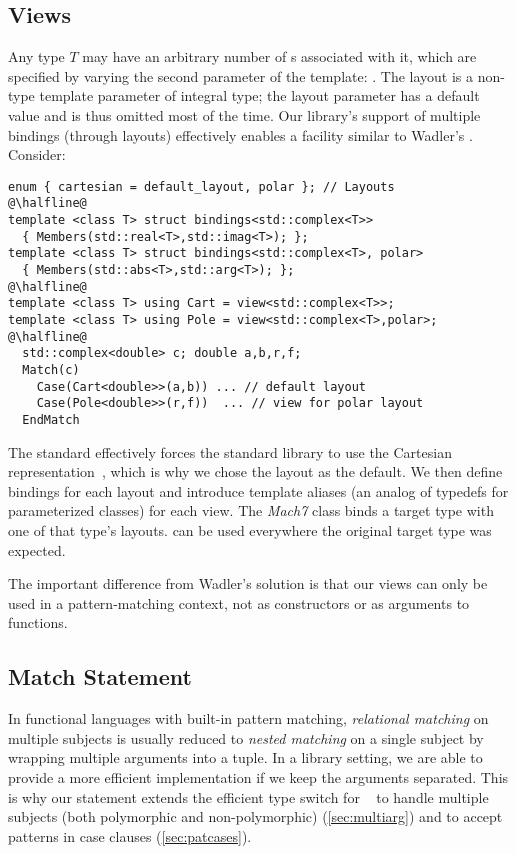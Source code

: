 \subsection{Views}
\label{sec:view}

Any type $T$ may have an arbitrary number of s associated with it, 
which are specified by varying the second parameter of the  
template: . The layout is a non-type template parameter of 
integral type; the layout parameter has a default value and is thus omitted most of the time.
Our library's support of multiple bindings (through layouts) effectively enables 
a facility similar to Wadler's \cite{Wadler87}. Consider:

\begin{lstlisting}[keepspaces]
enum { cartesian = default_layout, polar }; // Layouts
@\halfline@
template <class T> struct bindings<std::complex<T>>
  { Members(std::real<T>,std::imag<T>); };
template <class T> struct bindings<std::complex<T>, polar>
  { Members(std::abs<T>,std::arg<T>); };
@\halfline@
template <class T> using Cart = view<std::complex<T>>;
template <class T> using Pole = view<std::complex<T>,polar>;
@\halfline@
  std::complex<double> c; double a,b,r,f;
  Match(c)
    Case(Cart<double>>(a,b)) ... // default layout
    Case(Pole<double>>(r,f))  ... // view for polar layout
  EndMatch
\end{lstlisting}

\noindent
The \Cpp{} standard effectively forces the standard library to use the Cartesian 
representation~\cite[-4]{C++11}, which is why we chose the 
 layout as the default. We then define bindings for each 
layout and introduce template aliases (an analog of typedefs for parameterized 
classes) for each view. The \emph{Mach7} class  binds a 
target type with one of that type's layouts.   can be used everywhere the
original target type  was expected.

The important difference from Wadler's solution is that our views can only be 
used in a pattern-matching context, not as constructors or as arguments to functions.

\subsection{Match Statement}
\label{sec:matchstmt}

In functional languages with built-in pattern matching, \emph{relational 
matching} on multiple subjects is usually reduced to \emph{nested matching} on a 
single subject by wrapping multiple arguments into a tuple. In a library setting, 
we are able to provide a more efficient implementation if we keep the arguments 
separated. This is why our  statement extends the efficient type 
switch for \Cpp{}~\cite{TS12} to handle multiple subjects (both polymorphic and 
non-polymorphic) (\textsection\ref{sec:multiarg}) and to accept patterns in case 
clauses (\textsection\ref{sec:patcases}).

